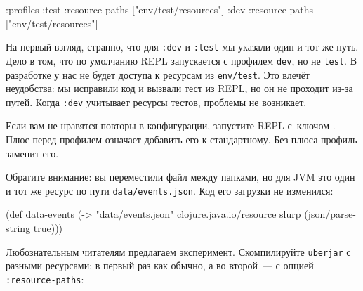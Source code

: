 \else

\begin{english}
  \begin{clojure}
:profiles
{:test {:resource-paths ["env/test/resources"]}
        :dev {:resource-paths ["env/test/resources"]}}
  \end{clojure}
\end{english}

\fi

На первый взгляд, странно, что для \verb|:dev| и \verb|:test| мы указали один и
тот же путь. Дело в том, что по умолчанию REPL запускается с профилем
\verb|dev|, но не \verb|test|. В разработке у нас не будет доступа к ресурсам из
\verb|env/test|. Это влечёт неудобства: мы исправили код и вызвали тест из REPL,
но он не проходит из-за путей. Когда \verb|:dev| учитывает ресурсы тестов,
проблемы не возникает.


Если вам не нравятся повторы в конфигурации, запустите REPL с~ключом
. Плюс перед профилем означает добавить его к
стандартному. Без плюса профиль заменит его.


Обратите внимание: вы переместили файл между папками, но для JVM это один и тот
же ресурс по пути \verb|data/events.json|. Код его загрузки не изменился:

\begin{english}
  \begin{clojure}
(def data-events
  (-> "data/events.json"
      clojure.java.io/resource
      slurp
      (json/parse-string true)))
  \end{clojure}
\end{english}

Любознательным читателям предлагаем эксперимент. Скомпилируйте \verb|uberjar|
с разными ресурсами: в первый раз как обычно, а во второй~--- с опцией
\verb|:resource-paths|:

\ifnarrow

\begin{english}
  \begin{clojure}
:profiles
  {:uberjar {:resource-paths
             ["env/test/resources"]}
  \end{clojure}
\end{english}

\else

\begin{english}
  \begin{clojure}
:profiles {:uberjar {:resource-paths
                     ["env/test/resources"]}
  \end{clojure}
\end{english}

